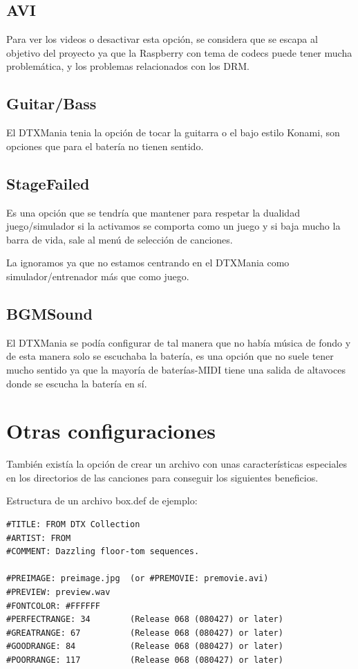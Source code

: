 \documentclass[a4paper,11pt,oneside]{book}
\begin{document}
\subsection{AVI}
Para ver los videos o desactivar esta opción, se considera que se escapa al objetivo del proyecto ya que la Raspberry con tema de codecs puede tener mucha problemática, y los problemas relacionados con los DRM.

\subsection{Guitar/Bass}
El DTXMania tenia la opción de tocar la guitarra o el bajo estilo Konami, son opciones que para el batería no tienen sentido.

\subsection{StageFailed}
Es una opción que se tendría que mantener para respetar la dualidad juego/simulador si la activamos se comporta como un juego y si baja mucho la barra de vida, sale al menú de selección de canciones.

La ignoramos ya que no estamos centrando en el DTXMania como simulador/entrenador más que como juego.

\subsection{BGMSound}
El DTXMania se podía configurar de tal manera que no había música de fondo y de esta manera solo se escuchaba la batería, es una opción que no suele tener mucho sentido ya que la mayoría de baterías-MIDI tiene una salida de altavoces donde se escucha la batería en sí.



\section{Otras configuraciones}
También existía la opción de crear un archivo con unas características especiales en los directorios de las canciones para conseguir los siguientes beneficios.

Estructura de un archivo box.def de ejemplo:

\begin{Verbatim}[frame=single]
#TITLE: FROM DTX Collection
#ARTIST: FROM
#COMMENT: Dazzling floor-tom sequences.

#PREIMAGE: preimage.jpg  (or #PREMOVIE: premovie.avi)
#PREVIEW: preview.wav
#FONTCOLOR: #FFFFFF
#PERFECTRANGE: 34        (Release 068 (080427) or later)
#GREATRANGE: 67          (Release 068 (080427) or later)
#GOODRANGE: 84           (Release 068 (080427) or later)
#POORRANGE: 117          (Release 068 (080427) or later)
\end{Verbatim}
\end{document}
